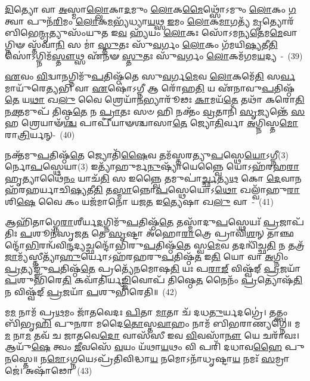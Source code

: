 \-\ul{𑌦𑌿}\-𑌤𑍍𑌯𑍋 𑌵𑌾 \ul{𑌅}\-𑌸𑍍𑌮𑌾\-\ul{𑌲𑍍𑌲𑍋}\-𑌕𑌾\-\ul{𑌦}\-𑌮𑍁𑌂 \ul{𑌲𑍋}\-𑌕\-\ul{𑌮𑍈}\-𑌥𑍍𑌸𑍋᳴\-𑌽𑌮𑍁𑌂 \ul{𑌲𑍋}\-𑌕𑌂 \ul{𑌗}\-𑌤𑍍𑌵𑌾 𑌪𑍁𑌨᳴\-\ul{𑌰𑌿}\-𑌮𑌂 \ul{𑌲𑍋}\-𑌕\-\ul{𑌮}\-𑌭𑍍𑌯᳴𑌧𑍍𑌯𑌾\-\ul{𑌯}\-𑌥𑍍𑌸 \ul{𑌇}\-𑌮𑌂 \ul{𑌲𑍋}\-𑌕\-\ul{𑌮𑌾}\-𑌗𑌤𑍍𑌯᳴ \ul{𑌮𑍃}\-𑌤𑍍𑌯𑍋𑌰᳴𑌬𑌿𑌭𑍇\-\ul{𑌨𑍍𑌮𑍃}\-𑌤𑍍𑌯𑍁𑌸𑌂᳴𑌯𑍁𑌤 𑌇\-\ul{𑌵} 𑌹𑍍𑌯᳴𑌯𑌂 \ul{𑌲𑍋}\-𑌕𑌃 𑌸𑍋᳴\-𑌽𑌮𑌨𑍍𑌯\-\ul{𑌤𑍇}\-𑌮\-\ul{𑌮𑍇}\-𑌵𑌾𑌗𑍍𑌨𑌿𑍟 𑌸𑍍𑌤᳴𑌵𑌾\-\ul{𑌨𑌿} 𑌸 𑌮𑌾॑ \ul{𑌸𑍍𑌤𑍁}\-𑌤𑌃 𑌸𑍁᳴\-\ul{𑌵}\-𑌰𑍍𑌗𑌂 \ul{𑌲𑍋}\-𑌕𑌂 𑌗᳴𑌮𑌯𑌿\-\ul{𑌷𑍍𑌯}\-𑌤𑍀\-\ul{𑌤𑌿} 𑌸𑍋॑\-𑌽𑌗𑍍𑌨𑌿𑌮᳴\-\ul{𑌸𑍍𑌤𑍗}\-𑌥𑍍𑌸 𑌏᳴𑌨𑍟 \ul{𑌸𑍍𑌤𑍁}\-𑌤𑌃 𑌸𑍁᳴\-\ul{𑌵}\-𑌰𑍍𑌗𑌂 \ul{𑌲𑍋}\-𑌕𑌮᳴𑌗𑌮\-\ul{𑌯}\-𑌦𑍍𑌯~-~(39)

\-\ul{𑌏}\-𑌵𑌂 \ul{𑌵𑌿}\-𑌦𑍍𑌵𑌾\-\ul{𑌨}\-𑌗𑍍𑌨𑌿𑌮𑍁᳴\-\ul{𑌪}\-𑌤𑌿𑌷𑍍𑌠᳴𑌤𑍇 𑌸𑍁\-\ul{𑌵}\-𑌰𑍍𑌗\-\ul{𑌮𑍇}\-𑌵 \ul{𑌲𑍋}\-𑌕𑌮𑍇᳴\-\ul{𑌤𑌿} 𑌸\-\ul{𑌰𑍍𑌵}\-𑌮𑌾𑌯𑍁᳴𑌰𑍇\-\ul{𑌤𑍍𑌯}\-𑌭𑌿 𑌵𑌾 \ul{𑌏}\-𑌷𑍋॑\-𑌽𑌗𑍍𑌨𑍀 𑌆 𑌰𑍋᳴𑌹\-\ul{𑌤𑌿} 𑌯 𑌏᳴𑌨𑌾𑌵𑍁\-\ul{𑌪}\-𑌤𑌿𑌷𑍍𑌠᳴\-\ul{𑌤𑍇} 𑌯\-\ul{𑌥𑌾} 𑌖\-\ul{𑌲𑍁} 𑌵𑍈 𑌶𑍍𑌰𑍇𑌯𑌾᳴\-\ul{𑌨}\-𑌭𑍍𑌯𑌾𑌰𑍂᳴𑌢𑌃 \ul{𑌕𑌾}\-𑌮𑌯᳴\-\ul{𑌤𑍇} 𑌤𑌥𑌾᳴ 𑌕𑌰𑍋\-\ul{𑌤𑌿} 𑌨\-\ul{𑌕𑍍𑌤}\-𑌮𑍁𑌪᳴ 𑌤𑌿𑌷𑍍𑌠\-\ul{𑌤𑍇} 𑌨 \ul{𑌪𑍍𑌰𑌾}\-𑌤𑌃 𑌸𑍞 𑌹𑌿 𑌨𑌕𑍍𑌤𑌂᳴ \ul{𑌵𑍍𑌰}\-𑌤𑌾𑌨𑌿᳴ \ul{𑌸𑍃}\-𑌜𑍍𑌯𑌨𑍍𑌤𑍇᳴ \ul{𑌸}\-𑌹 𑌶𑍍𑌰𑍇𑌯𑌾𑍟᳴\-\ul{𑌶𑍍𑌚} 𑌪𑌾𑌪𑍀᳴𑌯𑌾𑍟𑌶𑍍𑌚𑌾𑌸𑌾\-\ul{𑌤𑍇} 𑌜𑍍𑌯𑍋\-\ul{𑌤𑌿}\-𑌰𑍍𑌵𑌾 \ul{𑌅}\-𑌗𑍍𑌨𑌿𑌸𑍍𑌤\-\ul{𑌮𑍋} 𑌰𑌾\-\ul{𑌤𑍍𑌰𑌿}\-𑌰𑍍𑌯𑌨𑍍-~(40)

𑌨𑌕𑍍𑌤᳴𑌮𑍁\-\ul{𑌪}\-𑌤𑌿𑌷𑍍𑌠᳴\-\ul{𑌤𑍇} 𑌜𑍍𑌯𑍋𑌤𑌿᳴\-\ul{𑌷𑍈}\-𑌵 𑌤𑌮᳴𑌸𑍍𑌤𑌰𑌤𑍍𑌯𑍁\-\ul{𑌪}\-𑌸𑍍𑌥𑍇\-\ul{𑌯𑍋}\-\-𑌽𑌗𑍍𑌨𑍀(3)𑌰𑍍𑌨𑍋\-\ul{𑌪}\-\-𑌸𑍍𑌥𑍇𑌯𑌾(3) 𑌇𑌤𑍍𑌯𑌾᳴𑌹𑍁𑌰𑍍𑌮\-\ul{𑌨𑍁}\-𑌷𑍍𑌯𑌾᳴𑌯𑍇𑌨𑍍𑌨𑍍𑌵𑍈 𑌯𑍋\-𑌽𑌹᳴𑌰𑌹\-\ul{𑌰𑌾}\-𑌹𑍃𑌤𑍍𑌯𑌾\-𑌥𑍈᳴\-\ul{𑌨𑌂} 𑌯𑌾𑌚᳴\-\ul{𑌤𑌿} 𑌸 𑌇𑌨𑍍𑌨𑍍𑌵𑍈 𑌤𑌮𑍁𑌪𑌾॑\-\ul{𑌰𑍍𑌚𑍍𑌛}\-𑌤𑍍𑌯\-\ul{𑌥} 𑌕𑍋 \ul{𑌦𑍇}\-𑌵𑌾𑌨𑌹᳴𑌰𑌹𑌰𑍍𑌯𑌾𑌚𑌿\-\ul{𑌷𑍍𑌯}\-𑌤𑍀\-\ul{𑌤𑌿} 𑌤\-\ul{𑌸𑍍𑌮𑌾}\-𑌨𑍍𑌨𑍋\-\ul{𑌪}\-𑌸𑍍𑌥𑍇𑌯𑍋\-𑌽\-\ul{𑌥𑍋} 𑌖𑌲𑍍𑌵𑌾᳴𑌹𑍁\-\ul{𑌰𑌾}\-𑌶𑌿\-\ul{𑌷𑍇} 𑌵𑍈 𑌕𑌂 𑌯𑌜᳴𑌮𑌾𑌨𑍋 𑌯𑌜\-\ul{𑌤} 𑌇\-\ul{𑌤𑍍𑌯𑍇}\-𑌷𑌾 𑌖\-\ul{𑌲𑍁} 𑌵𑌾~-~(41)

𑌆𑌹𑌿᳴𑌤𑌾𑌗𑍍𑌨𑍇\-\ul{𑌰𑌾}\-𑌶𑍀𑌰𑍍𑌯\-\ul{𑌦}\-𑌗𑍍𑌨𑌿𑌮𑍁᳴\-\ul{𑌪}\-𑌤𑌿𑌷𑍍𑌠᳴\-\ul{𑌤𑍇} 𑌤𑌸𑍍𑌮𑌾᳴𑌦𑍁\-\ul{𑌪}\-𑌸𑍍𑌥𑍇𑌯𑌃᳴ \ul{𑌪𑍍𑌰}\-𑌜𑌾𑌪᳴𑌤𑌿𑌃 \ul{𑌪}\-𑌶𑍂𑌨᳴𑌸𑍃𑌜\-\ul{𑌤} 𑌤𑍇 \ul{𑌸𑍃}\-𑌷𑍍𑌟𑌾 𑌅᳴𑌹𑍋\-\ul{𑌰𑌾}\-𑌤𑍍𑌰𑍇 𑌪𑍍𑌰𑌾𑌵𑌿᳴\-\ul{𑌶}\-𑌨𑍍 𑌤𑌾𑌞𑍍𑌛𑌨𑍍𑌦𑍋᳴\-\-\ul{𑌭𑌿}\-𑌰𑌨𑍍𑌵᳴\-𑌵𑌿\-\ul{𑌨𑍍𑌦}\-𑌦𑍍𑌯𑌚𑍍𑌛𑌨𑍍𑌦𑍋᳴𑌭𑌿𑌰𑍁\-\ul{𑌪}\-𑌤𑌿𑌷𑍍𑌠᳴\-\ul{𑌤𑍇} 𑌸𑍍𑌵\-\ul{𑌮𑍇}\-𑌵 𑌤𑌦𑌨𑍍𑌵𑌿᳴𑌚𑍍𑌛\-\ul{𑌤𑌿} 𑌨 𑌤𑌤𑍍𑌰᳴ \ul{𑌜𑌾}\-𑌮𑍍𑌯᳴𑌸𑍍𑌤𑍀𑌤𑍍𑌯𑌾᳴\-\ul{𑌹𑍁}\-𑌰𑍍𑌯𑍋\-𑌽𑌹᳴𑌰𑌹𑌰𑍁\-\ul{𑌪}\-𑌤𑌿𑌷𑍍𑌠᳴\-\ul{𑌤} 𑌇\-\ul{𑌤𑌿} 𑌯𑍋 𑌵𑌾 \ul{𑌅}\-𑌗𑍍𑌨𑌿𑌂 \ul{𑌪𑍍𑌰}\-𑌤𑍍𑌯𑌙𑍍𑌙𑍁᳴\-\ul{𑌪}\-𑌤𑌿𑌷𑍍𑌠᳴\-\ul{𑌤𑍇} 𑌪𑍍𑌰𑌤𑍍𑌯𑍇᳴𑌨𑌮𑍋𑌷\-\ul{𑌤𑌿} 𑌯𑌃 𑌪\-\ul{𑌰𑌾}\-\-\ul{𑌙𑍍} 𑌵𑌿𑌷𑍍𑌵᳴𑌙𑍍 \ul{𑌪𑍍𑌰}\-𑌜𑌯𑌾᳴ \ul{𑌪}\-𑌶𑍁𑌭𑌿᳴𑌰𑍇\-\ul{𑌤𑌿} 𑌕𑌵𑌾᳴𑌤𑌿𑌰𑍍𑌯\-\ul{𑌙𑍍𑌙𑌿}\-𑌵𑍋𑌪᳴ 𑌤𑌿𑌷𑍍𑌠𑍇\-\ul{𑌤} 𑌨𑍈𑌨𑌂᳴ \ul{𑌪𑍍𑌰}\-𑌤𑍍𑌯𑍋𑌷᳴\-\ul{𑌤𑌿} 𑌨 𑌵𑌿𑌷𑍍𑌵᳴𑌙𑍍 \ul{𑌪𑍍𑌰}\-𑌜𑌯𑌾᳴ \ul{𑌪}\-𑌶𑍁𑌭𑌿᳴𑌰𑍇𑌤𑌿॥~(42)

{\anuvakamend[{\-\ul{𑌸𑌿}\-𑌕𑍍𑌤𑌸𑍍𑌯᳴ \ul{𑌸}\-𑌹 𑌭᳴𑌵\-\ul{𑌤𑌿} 𑌯𑍋 𑌯𑌤𑍍𑌖\-\ul{𑌲𑍁} 𑌵𑍈 \ul{𑌪}\-𑌶𑍁\-\ul{𑌭𑌿}\-𑌸𑍍𑌤𑍍𑌰𑌯𑍋᳴𑌦𑌶 𑌚}]}%

𑌮\-\ul{𑌮} 𑌨𑌾𑌮᳴ 𑌪𑍍𑌰\-\ul{𑌥}\-𑌮𑌂 𑌜𑌾᳴𑌤𑌵𑍇𑌦𑌃 \ul{𑌪𑌿}\-𑌤𑌾 \ul{𑌮𑌾}\-𑌤𑌾 𑌚᳴ 𑌦𑌧\-\ul{𑌤𑍁}\-𑌰𑍍𑌯𑌦𑌗𑍍𑌰𑍇॑। 𑌤𑌤𑍍𑌤𑍍𑌵𑌂 𑌬𑌿᳴𑌭𑍃\-\ul{𑌹𑌿} 𑌪𑍁\-\ul{𑌨}\-𑌰𑌾 𑌮𑌦𑍈\-\ul{𑌤𑍋}\-𑌸𑍍𑌤\-\ul{𑌵𑌾}\-𑌹𑌂 𑌨𑌾𑌮᳴ 𑌬𑌿𑌭𑌰𑌾𑌣𑍍𑌯𑌗𑍍𑌨𑍇॥ 𑌮\-\ul{𑌮} 𑌨𑌾\-\ul{𑌮} 𑌤𑌵᳴ 𑌚 𑌜𑌾𑌤𑌵𑍇\-\ul{𑌦𑍋} 𑌵𑌾𑌸᳴𑌸𑍀 𑌇𑌵 \ul{𑌵𑌿}\-𑌵𑌸𑌾᳴\-\ul{𑌨𑍗} 𑌯𑍇 𑌚𑌰𑌾᳴𑌵𑌃। 𑌆𑌯𑍁᳴\-\ul{𑌷𑍇} 𑌤𑍍𑌵𑌂 \ul{𑌜𑍀}\-𑌵𑌸𑍇᳴ \ul{𑌵}\-𑌯𑌂 𑌯᳴𑌥𑌾\-\ul{𑌯}\-𑌥𑌂 𑌵𑌿 𑌪𑌰𑌿᳴ 𑌦𑌧𑌾𑌵\-\ul{𑌹𑍈} 𑌪𑍁\-\ul{𑌨}\-𑌸𑍍𑌤𑍇॥ 𑌨\-\ul{𑌮𑍋}\-\-𑌽𑌗𑍍𑌨𑌯𑍇\-𑌽𑌪𑍍𑌰᳴𑌤𑌿𑌵𑌿𑌦𑍍𑌧𑌾\-\ul{𑌯} 𑌨𑌮𑍋\-𑌽𑌨𑌾᳴𑌧𑍃𑌷𑍍𑌟𑌾\-\ul{𑌯} 𑌨𑌮𑌃᳴ \ul{𑌸}\-𑌮𑍍𑌰𑌾𑌜𑍇॑। 𑌅𑌷𑌾᳴𑌢𑍋~(43)

